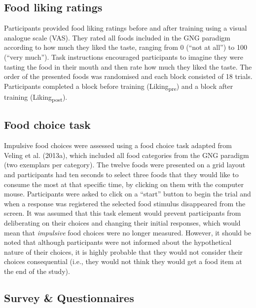 \documentclass[man,floatsintext]{apa6}
\begin{document}
\hypertarget{food_ratings}{%
\subsection{Food liking ratings}\label{food_ratings}}

\par

Participants provided food liking ratings before and after training using a visual analogue scale (VAS). They rated all foods included in the GNG paradigm according to how much they liked the taste, ranging from 0 (\enquote{not at all}) to 100 (\enquote{very much}). Task instructions encouraged participants to imagine they were tasting the food in their mouth and then rate how much they liked the taste. The order of the presented foods was randomised and each block consisted of 18 trials. Participants completed a block before training (Liking\textsubscript{pre}) and a block after training (Liking\textsubscript{post}).

\hypertarget{food_choice}{%
\subsection{Food choice task}\label{food_choice}}

Impulsive food choices were assessed using a food choice task adapted from Veling et al. (2013a), which included all food categories from the GNG paradigm (two exemplars per category). The twelve foods were presented on a grid layout and participants had ten seconds to select three foods that they would like to consume the most at that specific time, by clicking on them with the computer mouse. Participants were asked to click on a \enquote{start} button to begin the trial and when a response was registered the selected food stimulus disappeared from the screen. It was assumed that this task element would prevent participants from deliberating on their choices and changing their initial responses, which would mean that \emph{impulsive} food choices were no longer measured. However, it should be noted that although participants were not informed about the hypothetical nature of their choices, it is highly probable that they would not consider their choices consequential (i.e., they would not think they would get a food item at the end of the study).

\hypertarget{questionnaires}{%
\subsection{Survey \& Questionnaires}\label{questionnaires}}
\end{document}
